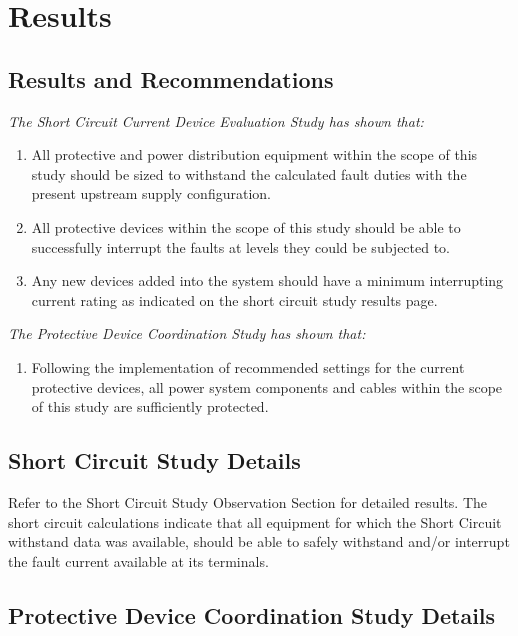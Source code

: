 
\section{Results}
\label{af:results}

\subsection{Results and Recommendations}
\label{af:results:afrr}

\noindent\emph{The Short Circuit Current Device Evaluation Study has shown that:}
\begin{enumerate}
	\item All protective and power distribution equipment within the scope of this study should be sized to withstand the calculated fault duties with the present upstream supply configuration.

	\item All protective devices within the scope of this study should be able to successfully interrupt the faults at levels they could be subjected to.

	\item Any new devices added into the system should have a minimum interrupting current rating as indicated on the short circuit study results page.
\end{enumerate}

\noindent\emph{The Protective Device Coordination Study has shown that:}
\begin{enumerate}
	\item Following the implementation of recommended settings for the current protective devices, all power system components and cables within the scope of this study are sufficiently protected.
\end{enumerate}

\subsection{Short Circuit Study Details}
\label{af:results:sccd}

\noindent Refer to the Short Circuit Study Observation Section for detailed results.  The short circuit calculations indicate that all equipment for which the Short Circuit withstand data was available, should be able to safely withstand and/or interrupt the fault current available at its terminals.

\subsection{Protective Device Coordination Study Details}
\label{af:results:pdcd}

